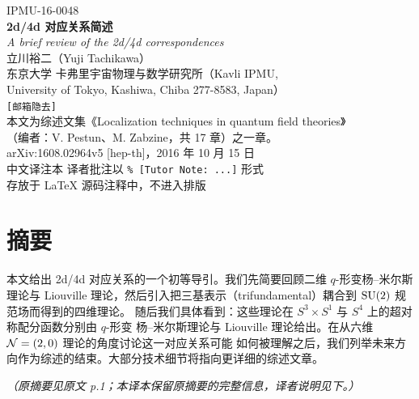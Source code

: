 \begin{titlepage}
\centering
\vspace*{2.2cm}

{\small IPMU-16-0048}\\[2.4cm]

{\LARGE\bfseries 2d/4d 对应关系简述}\\[0.6cm]
{\large\itshape A brief review of the 2d/4d correspondences}\\[2.2cm]

{\large 立川裕二（Yuji Tachikawa）}\\[0.35cm]
{\small 东京大学 卡弗里宇宙物理与数学研究所（Kavli IPMU,\\ University of Tokyo, Kashiwa, Chiba 277-8583, Japan）}\\[0.15cm]
{\small\texttt{[邮箱隐去]}}\\[1.8cm]

{\small 本文为综述文集《Localization techniques in quantum field theories》\\
（编者：V. Pestun、M. Zabzine，共 17 章）之一章。}\\[0.2cm]
{\small arXiv:1608.02964v5 [hep-th]，2016 年 10 月 15 日}\\[2.6cm]

{\small 中文译注本 \quad 译者批注以 \texttt{\% [Tutor Note: ...]} 形式\\
存放于 \LaTeX{} 源码注释中，不进入排版}
\vfill
\end{titlepage}

\section*{摘要}
本文给出 2d/4d 对应关系的一个初等导引。我们先简要回顾二维 $q$-形变杨--米尔斯理论与
Liouville 理论，然后引入把三基表示（trifundamental）耦合到 $\mathrm{SU}(2)$ 规范场而得到的四维理论。
随后我们具体看到：这些理论在 $S^3\times S^1$ 与 $S^4$ 上的超对称配分函数分别由 $q$-形变
杨--米尔斯理论与 Liouville 理论给出。在从六维 $\mathcal{N}=(2,0)$ 理论的角度讨论这一对应关系可能
如何被理解之后，我们列举未来方向作为综述的结束。大部分技术细节将指向更详细的综述文章。

\medskip
\noindent\textit{（原摘要见原文 p.1；本译本保留原摘要的完整信息，译者说明见下。）}


